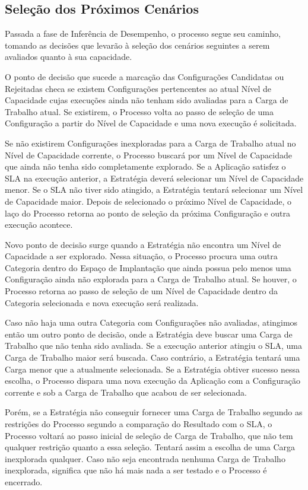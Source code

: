\subsection{Seleção dos Próximos Cenários}
Passada a fase de Inferência de Desempenho, o processo segue seu caminho, tomando
as decisões que levarão à seleção dos cenários seguintes a serem avaliados quanto
à sua capacidade.

O ponto de decisão que sucede a marcação das Configurações Candidatas ou Rejeitadas
checa se existem Configurações pertencentes ao atual Nível de Capacidade cujas 
execuções ainda não tenham sido avaliadas para a Carga de Trabalho atual. Se 
existirem, o Processo volta ao passo de seleção de uma Configuração a partir do 
Nível de Capacidade e uma nova execução é solicitada.

Se não existirem Configurações inexploradas para a Carga de Trabalho atual no
Nível de Capacidade corrente, o Processo buscará por um Nível de Capacidade que 
ainda não tenha sido completamente explorado. Se a Aplicação satisfez o SLA na 
execução anterior, a Estratégia deverá selecionar um Nível de Capacidade menor. 
Se o SLA não tiver sido atingido, a Estratégia tentará selecionar um  Nível de 
Capacidade maior. Depois de selecionado o próximo Nível de Capacidade, o laço do
Processo retorna ao ponto de seleção da próxima Configuração e outra execução 
acontece.
   
Novo ponto de decisão surge quando a Estratégia não encontra um Nível de 
Capacidade a ser explorado. Nessa situação, o Processo procura uma outra
Categoria dentro do Espaço de Implantação que ainda possua pelo menos uma
Configuração ainda não explorada para a Carga de Trabalho atual. Se houver,
o Processo retorna ao passo de seleção de um Nível de Capacidade dentro da
Categoria selecionada e nova execução será realizada.

Caso não haja uma outra Categoria com Configurações não avaliadas, atingimos
então um outro ponto de decisão, onde a Estratégia deve buscar uma Carga 
de Trabalho que não tenha sido avaliada. Se a execução anterior atingiu o SLA,
uma Carga de Trabalho maior será buscada. Caso contrário, a Estratégia tentará
uma Carga menor que a atualmente selecionada. Se a Estratégia obtiver sucesso
nessa escolha, o Processo dispara uma nova execução da Aplicação com a Configuração
corrente e sob a Carga de Trabalho que acabou de ser selecionada.

Porém, se a Estratégia não conseguir fornecer uma Carga de Trabalho segundo as 
restrições do Processo segundo a comparação do Resultado com o SLA, o Processo 
voltará ao passo inicial de seleção de Carga de Trabalho, que não tem qualquer 
restrição quanto a essa seleção. Tentará assim a escolha de uma Carga inexplorada
qualquer. Caso não seja encontrada nenhuma Carga de Trabalho inexplorada, significa
que não há mais nada a ser testado e o Processo é encerrado.

